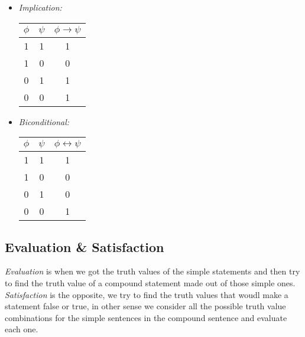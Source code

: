 \documentclass[10pt,a4pape,twocolumn]{article}
\begin{document}
\begin{itemize}
                        \item \textit{Implication:}
                            \begin{center}
                                \begin{tabular}{c|c||c}
                                    $\phi$ & $\psi$ & $\phi\rightarrow\psi$\\
                                    \hline\hline
                                    1 & 1 & 1 \\
                                    1 & 0 & 0 \\
                                    0 & 1 & 1 \\
                                    0 & 0 & 1
                                \end{tabular}
                            \end{center}
                        \item \textit{Biconditional:}
                            \begin{center}
                                \begin{tabular}{c|c||c}
                                    $\phi$ & $\psi$ & $\phi\leftrightarrow\psi$\\
                                    \hline\hline
                                    1 & 1 & 1 \\
                                    1 & 0 & 0 \\
                                    0 & 1 & 0 \\
                                    0 & 0 & 1 \\
                                \end{tabular}
                            \end{center}
                \end{itemize}
            \subsection{Evaluation \& Satisfaction}
                    \textit{Evaluation} is when we got the truth values of the simple statements and then try to find the truth value of a compound statement made out of those simple ones. \textit{Satisfaction} is the opposite, we try to find the truth values that woudl make a statement false or true, in other sense we consider all the possible truth value combinations for the simple sentences in the compound sentence and evaluate each one.
\end{document}
